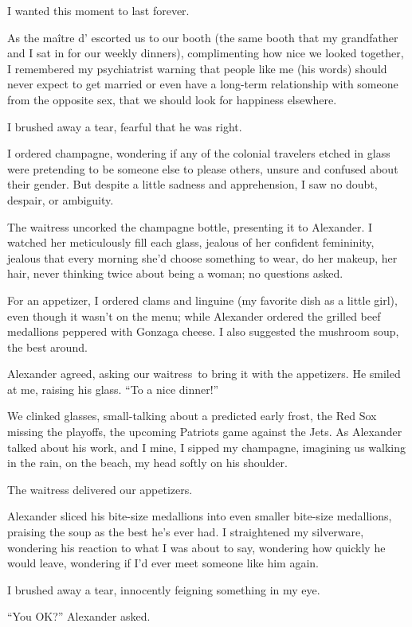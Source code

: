 I wanted this moment to last forever.

As the maître d' escorted us to our booth (the same booth that my
grandfather and I sat in for our weekly dinners), complimenting how nice
we looked together, I remembered my psychiatrist warning that people
like me (his words) should never expect to get married or even have a
long-term relationship with someone from the opposite sex, that we
should look for happiness elsewhere.

I brushed away a tear, fearful that he was right.

I ordered champagne, wondering if any of the colonial travelers etched
in glass were pretending to be someone else to please others, unsure and
confused about their gender. But despite a little sadness and
apprehension, I saw no doubt, despair, or ambiguity.

The waitress uncorked the champagne bottle, presenting it to Alexander.
I watched her meticulously fill each glass, jealous of her confident
femininity, jealous that every morning she'd choose something to wear,
do her makeup, her hair, never thinking twice about being a woman; no
questions asked.

For an appetizer, I ordered clams and linguine (my favorite dish as a
little girl), even though it wasn't on the menu; while Alexander ordered
the grilled beef medallions peppered with Gonzaga cheese. I also
suggested the mushroom soup, the best around.

Alexander agreed, asking our waitress~to bring it with the appetizers.
He smiled at me, raising his glass. ``To a nice dinner!''

We clinked glasses, small-talking about a predicted early frost, the Red
Sox missing the playoffs, the upcoming Patriots game against the Jets.
As Alexander talked about his work, and I mine, I sipped my champagne,
imagining us walking in the rain, on the beach, my head softly on his
shoulder.

The waitress delivered our appetizers.

Alexander sliced his bite-size medallions into even smaller bite-size
medallions, praising the soup as the best he's ever had. I straightened
my silverware, wondering his reaction to what I was about to say,
wondering how quickly he would leave, wondering if I'd ever meet someone
like him again.

I brushed away a tear, innocently feigning something in my eye.

``You OK?'' Alexander asked.

